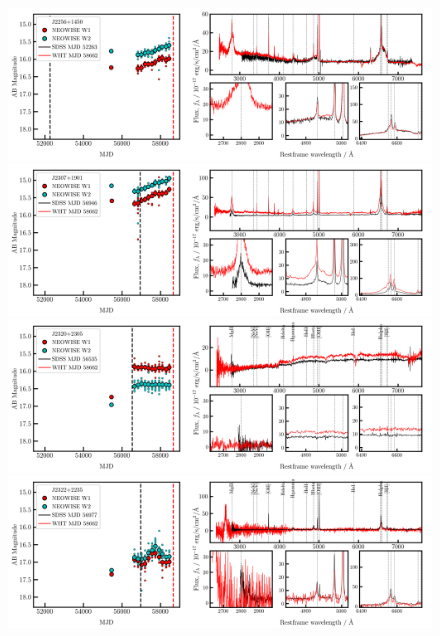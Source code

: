 \documentclass[a4paper,fleqn,usenatbib]{mnras}
\begin{document}
\begin{figure}
  \centering
    \includegraphics[width=16.7cm, trim=0.0cm 0.05cm 0.2cm 0.1cm, clip]
  {../plots/LCs_and_spectra/J2256+1450_landscape_temp.png}
  \includegraphics[width=16.7cm, trim=0.0cm 0.05cm 0.2cm 0.1cm, clip]
  {../plots/LCs_and_spectra/J2307+1901_landscape_temp.png}
    \includegraphics[width=16.7cm, trim=0.0cm 0.05cm 0.2cm 0.1cm, clip]
    {../plots/LCs_and_spectra/J2320+2305_landscape_temp.png}
      \includegraphics[width=16.7cm, trim=0.0cm 0.05cm 0.2cm 0.1cm, clip]
  {../plots/LCs_and_spectra/J2322+2235_landscape_temp.png}
  \vspace{-12pt}
  \caption[]{}
  \label{fig:all_spectra_f}
\end{figure}



\bsp	%
\label{lastpage}
\end{document}
